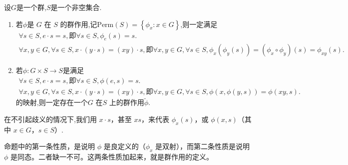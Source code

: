 \documentclass[../../main.tex]{subfiles}
\begin{document}
\begin{proposition}[群作用的等价条件]\label{proposition:群作用的等价条件}
设$G$是一个群,$S$是一个非空集合.
\begin{enumerate}[(1)]
\item 若$\phi$是 \(G\) 在 \(S\) 的群作用,记$\mathrm{Perm}\left( S \right) =\left\{ \phi _x:x\in G \right\}$,则一定满足
\begin{gather*}
\forall s\in S,e\cdot s=s,\text{即}\forall s\in S,\phi _e\left( s \right) =s.
\\
\forall x,y\in G,\forall s\in S,x\cdot (y\cdot s)=(xy)\cdot s,\text{即}\forall x,y\in G,\forall s\in S,\phi _x\left( \phi _y\left( s \right) \right) =(\phi _x\circ \phi _y)\left( s \right) =\phi _{xy}\left( s \right) .
\end{gather*}

\item 若$\phi :G\times S\rightarrow S$是满足
\begin{gather*}
\forall s\in S,e\cdot s=s,\text{即}\forall s\in S,\phi \left( e,s \right) =s.
\\
\forall x,y\in G,\forall s\in S,x\cdot (y\cdot s)=(xy)\cdot s,\text{即}\forall x,y\in G,\forall s\in S,\phi \left( x,\phi \left( y,s \right) \right) =\phi \left( xy,s \right) .
\end{gather*}
的映射,则一定存在一个\(G\) 在\(S\) 上的群作用$\widetilde{\phi }$.
\end{enumerate}
\end{proposition}
\begin{remark}
在不引起歧义的情况下,我们用 \(x \cdot s\)，甚至 \(xs\)，来代表 \(\phi_x(s)\)，或 \(\phi(x, s)\)（其中 \(x \in G\)，\(s \in S\)）.
\end{remark}
\begin{note}
命题中的第一条性质，是说明 \(\phi\) 是良定义的（\(\phi_x\) 是双射），而第二条性质是说明 \(\phi\) 是同态。二者缺一不可。这两条性质加起来，就是群作用的定义。
\end{note}
\end{document}
